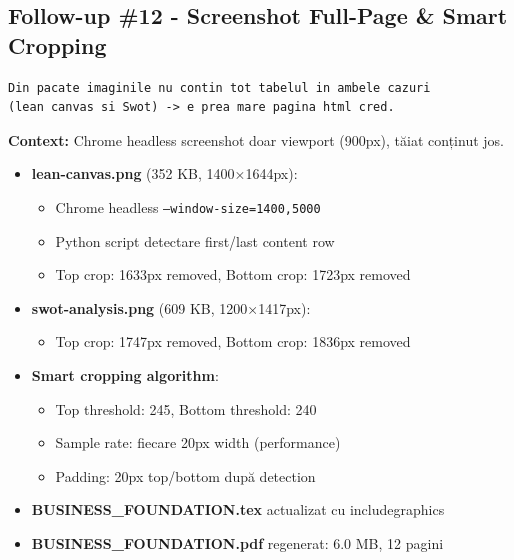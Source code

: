 \documentclass[11pt,a4paper]{article}
\begin{document}
\subsection{Follow-up \#12 - Screenshot Full-Page \& Smart Cropping}

\begin{tcolorbox}[colback=promptbackground,colframe=blue!75!black,title=Prompt Input]
\begin{verbatim}
Din pacate imaginile nu contin tot tabelul in ambele cazuri
(lean canvas si Swot) -> e prea mare pagina html cred.
\end{verbatim}
\end{tcolorbox}

\textbf{Context:} Chrome headless screenshot doar viewport (900px), tăiat conținut jos.

\begin{tcolorbox}[colback=outputbackground,colframe=green!75!black,title=Output Generat]
\begin{itemize}[leftmargin=*]
    \item \textbf{lean-canvas.png} (352 KB, 1400×1644px):
    \begin{itemize}
        \item Chrome headless \texttt{--window-size=1400,5000}
        \item Python script detectare first/last content row
        \item Top crop: 1633px removed, Bottom crop: 1723px removed
    \end{itemize}
    \item \textbf{swot-analysis.png} (609 KB, 1200×1417px):
    \begin{itemize}
        \item Top crop: 1747px removed, Bottom crop: 1836px removed
    \end{itemize}
    \item \textbf{Smart cropping algorithm}:
    \begin{itemize}
        \item Top threshold: 245, Bottom threshold: 240
        \item Sample rate: fiecare 20px width (performance)
        \item Padding: 20px top/bottom după detection
    \end{itemize}
    \item \textbf{BUSINESS\_FOUNDATION.tex} actualizat cu includegraphics
    \item \textbf{BUSINESS\_FOUNDATION.pdf} regenerat: 6.0 MB, 12 pagini
\end{itemize}
\end{tcolorbox}
\end{document}
